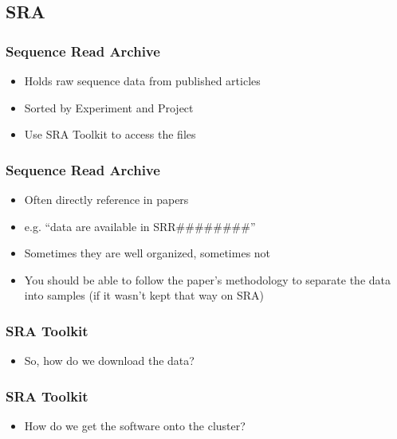 \documentclass[14pt]{beamer}
\begin{document}
\subsection{SRA}

\begin{frame}
\frametitle{Sequence Read Archive}
\begin{itemize}
	\item<+-> Holds raw sequence data from published articles
	\item<+-> Sorted by Experiment and Project
	\item<+-> Use SRA Toolkit to access the files
\end{itemize}
\end{frame}

\begin{frame}
\frametitle{Sequence Read Archive}
\begin{itemize}
	\item<+-> Often directly reference in papers
	\item<+-> e.g. ``data are available in SRR\#\#\#\#\#\#\#\#''
	\item<+-> Sometimes they are well organized, sometimes not
	\item<+-> You should be able to follow the paper's methodology to separate the data into samples (if it wasn't kept that way on SRA)
\end{itemize}
\end{frame}

\begin{frame}
\frametitle{SRA Toolkit}
\begin{itemize}
	\item<+-> So, how do we download the data?
\end{itemize}
\end{frame}

\begin{frame}
\frametitle{SRA Toolkit}
\begin{itemize}
	\item<+-> How do we get the software onto the cluster?
\end{itemize}
\end{frame}
\end{document}
